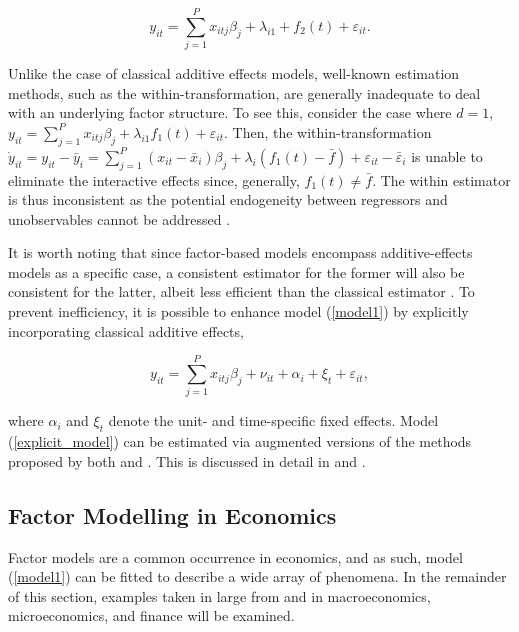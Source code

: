 \begin{equation}
      y_{it} = \sum_{j=1}^P x_{itj}\beta_j + \lambda_{i1} + f_{2}(t) + \varepsilon_{it} .
\end{equation}

Unlike the case of classical additive effects models, well-known estimation methods, such as the within-transformation, are generally inadequate to deal with an underlying factor structure. To see this, consider the case where $d =1$, $ y_{it} = \sum_{j=1}^P x_{itj}\beta_j + \lambda_{i1}f_1(t) + \varepsilon_{it}$. Then, the within-transformation $ \dot{y}_{it}   =   y_{it} - \bar{y}_i = \sum_{j=1}^P (x_{it} - \bar{x}_i)\beta_j + \lambda_i(f_1(t) - \bar{f}) + \varepsilon_{it} - \bar{\varepsilon}_{i}$ is unable to eliminate the interactive effects since, generally, $f_1(t) \neq \bar{f}$. The within estimator is thus inconsistent as the potential endogeneity between regressors and unobservables cannot be addressed \citep{bai2009panel}. 

It is worth noting that since factor-based models encompass additive-effects models as a specific case, a consistent estimator for the former will also be consistent for the latter, albeit less efficient than the classical estimator \citep{bai2009panel}. To prevent inefficiency, it is possible to enhance model (\ref{model1}) by explicitly incorporating classical additive effects,

\begin{equation}\label{explicit_model}
    y_{it} = \sum_{j=1}^P x_{itj}\beta_j + \nu_{it} + \alpha_i + \xi_t + \varepsilon_{it},
\end{equation}

where $\alpha_i$ and $\xi_t$ denote the unit- and time-specific fixed effects. Model (\ref{explicit_model}) can be estimated via augmented versions of the methods proposed by both \citet{bai2009panel} and \citet{kneip2012new}. This is discussed in detail in \citet{bai2009panel} and \citet{bada2012phtt}.


\subsection{Factor Modelling in Economics}\label{factor_modeling}

Factor models are a common occurrence in economics, and as such, model (\ref{model1}) can be fitted to describe a wide array of phenomena. In the remainder of this section, examples taken in large from \citet{bai2008large} and \citet{bai2009panel} in macroeconomics, microeconomics, and finance will be examined.

